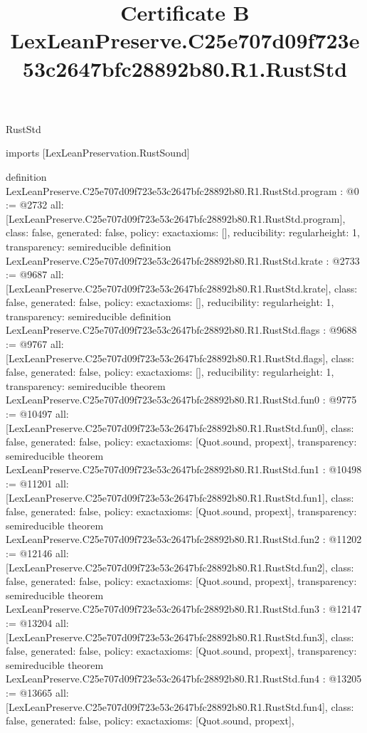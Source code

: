 \begin{lexlean}{RustStd}
\title{Certificate B LexLeanPreserve.C25e707d09f723e53c2647bfc28892b80.R1.RustStd}
\begin{coremodule}
imports [LexLeanPreservation.RustSound]

definition LexLeanPreserve.C25e707d09f723e53c2647bfc28892b80.R1.RustStd.program : @0 := @2732 {
  all: [LexLeanPreserve.C25e707d09f723e53c2647bfc28892b80.R1.RustStd.program],
  class: false,
  generated: false,
  policy: exact{axioms: []},
  reducibility: regular{height: 1},
  transparency: semireducible
}
definition LexLeanPreserve.C25e707d09f723e53c2647bfc28892b80.R1.RustStd.krate : @2733 := @9687 {
  all: [LexLeanPreserve.C25e707d09f723e53c2647bfc28892b80.R1.RustStd.krate],
  class: false,
  generated: false,
  policy: exact{axioms: []},
  reducibility: regular{height: 1},
  transparency: semireducible
}
definition LexLeanPreserve.C25e707d09f723e53c2647bfc28892b80.R1.RustStd.flags : @9688 := @9767 {
  all: [LexLeanPreserve.C25e707d09f723e53c2647bfc28892b80.R1.RustStd.flags],
  class: false,
  generated: false,
  policy: exact{axioms: []},
  reducibility: regular{height: 1},
  transparency: semireducible
}
theorem LexLeanPreserve.C25e707d09f723e53c2647bfc28892b80.R1.RustStd.fun0 : @9775 := @10497 {
  all: [LexLeanPreserve.C25e707d09f723e53c2647bfc28892b80.R1.RustStd.fun0],
  class: false,
  generated: false,
  policy: exact{axioms: [Quot.sound, propext]},
  transparency: semireducible
}
theorem LexLeanPreserve.C25e707d09f723e53c2647bfc28892b80.R1.RustStd.fun1 : @10498 := @11201 {
  all: [LexLeanPreserve.C25e707d09f723e53c2647bfc28892b80.R1.RustStd.fun1],
  class: false,
  generated: false,
  policy: exact{axioms: [Quot.sound, propext]},
  transparency: semireducible
}
theorem LexLeanPreserve.C25e707d09f723e53c2647bfc28892b80.R1.RustStd.fun2 : @11202 := @12146 {
  all: [LexLeanPreserve.C25e707d09f723e53c2647bfc28892b80.R1.RustStd.fun2],
  class: false,
  generated: false,
  policy: exact{axioms: [Quot.sound, propext]},
  transparency: semireducible
}
theorem LexLeanPreserve.C25e707d09f723e53c2647bfc28892b80.R1.RustStd.fun3 : @12147 := @13204 {
  all: [LexLeanPreserve.C25e707d09f723e53c2647bfc28892b80.R1.RustStd.fun3],
  class: false,
  generated: false,
  policy: exact{axioms: [Quot.sound, propext]},
  transparency: semireducible
}
theorem LexLeanPreserve.C25e707d09f723e53c2647bfc28892b80.R1.RustStd.fun4 : @13205 := @13665 {
  all: [LexLeanPreserve.C25e707d09f723e53c2647bfc28892b80.R1.RustStd.fun4],
  class: false,
  generated: false,
  policy: exact{axioms: [Quot.sound, propext]},
}
\end{coremodule}
\end{lexlean}
